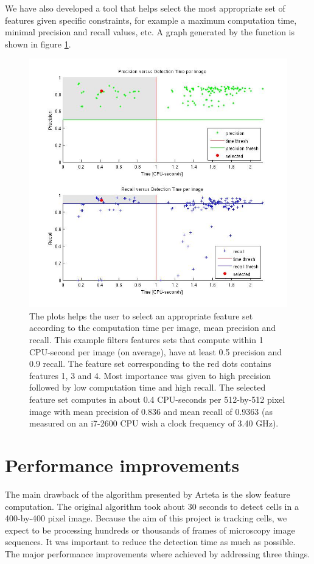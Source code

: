 	We have also developed a tool that helps select the most appropriate set of features given specific constraints, for example a maximum computation time, minimal precision and recall values, etc. A graph generated by the function is shown in figure \ref{fig:bestFeatureSelector}.
	
	\begin{figure}[h]
		\includegraphics[width=\textwidth]{images/best_features}
		\caption{The plots helps the user to select an appropriate feature set according to the computation time per image, mean precision and recall. This example filters features sets that compute within 1 CPU-second per image (on average), have at least 0.5 precision and 0.9 recall. The feature set corresponding to the red dots contains features 1, 3 and 4. Most importance was given to high precision followed by low computation time and high recall. The selected feature set computes in about 0.4 CPU-seconds per 512-by-512 pixel image with mean precision of 0.836 and mean recall of 0.9363 (as measured on an i7-2600 CPU wish a clock frequency of 3.40 GHz).}
	    \label{fig:bestFeatureSelector}
	\end{figure}
	
	\section{Performance improvements \statusfirstdraft}
	\label{sec:detector_changes}
		The main drawback of the algorithm presented by Arteta \cite{arteta12} is the slow feature computation. The original algorithm took about 30 seconds to detect cells in a 400-by-400 pixel image. Because the aim of this project is tracking cells, we expect to be processing hundreds or thousands of frames of microscopy image sequences. It was important to reduce the detection time as much as possible. The major performance improvements where achieved by addressing three things.
		
